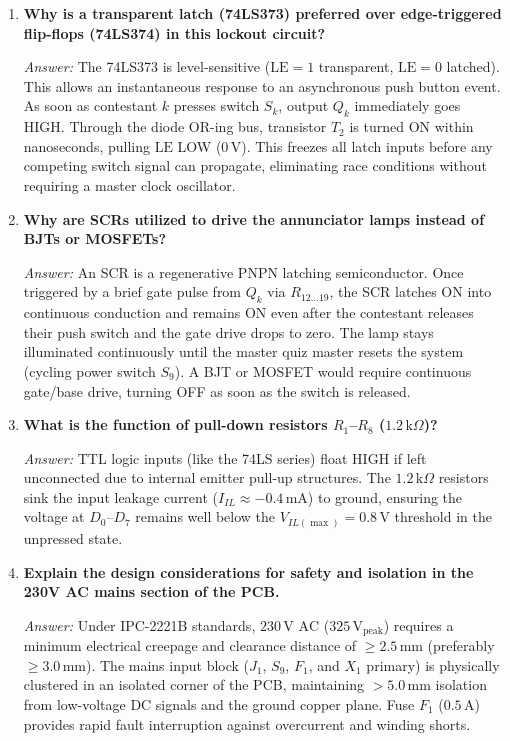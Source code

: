 \documentclass[11pt,a4paper]{article}
\begin{document}
\begin{enumerate}
    \item \textbf{Why is a transparent latch (74LS373) preferred over edge-triggered flip-flops (74LS374) in this lockout circuit?}
    
    \textit{Answer:} The 74LS373 is level-sensitive ($\text{LE} = 1$ transparent, $\text{LE} = 0$ latched). This allows an instantaneous response to an asynchronous push button event. As soon as contestant $k$ presses switch $S_k$, output $Q_k$ immediately goes HIGH. Through the diode OR-ing bus, transistor $T_2$ is turned ON within nanoseconds, pulling $\text{LE}$ LOW ($0\,\text{V}$). This freezes all latch inputs before any competing switch signal can propagate, eliminating race conditions without requiring a master clock oscillator.

    \item \textbf{Why are SCRs utilized to drive the annunciator lamps instead of BJTs or MOSFETs?}
    
    \textit{Answer:} An SCR is a regenerative PNPN latching semiconductor. Once triggered by a brief gate pulse from $Q_k$ via $R_{12\dots 19}$, the SCR latches ON into continuous conduction and remains ON even after the contestant releases their push switch and the gate drive drops to zero. The lamp stays illuminated continuously until the master quiz master resets the system (cycling power switch $S_9$). A BJT or MOSFET would require continuous gate/base drive, turning OFF as soon as the switch is released.

    \item \textbf{What is the function of pull-down resistors $R_1$--$R_8$ ($1.2\,\text{k}\Omega$)?}
    
    \textit{Answer:} TTL logic inputs (like the 74LS series) float HIGH if left unconnected due to internal emitter pull-up structures. The $1.2\,\text{k}\Omega$ resistors sink the input leakage current ($I_{IL} \approx -0.4\,\text{mA}$) to ground, ensuring the voltage at $D_0$--$D_7$ remains well below the $V_{IL(\max)} = 0.8\,\text{V}$ threshold in the unpressed state.

    \item \textbf{Explain the design considerations for safety and isolation in the 230V AC mains section of the PCB.}
    
    \textit{Answer:} Under IPC-2221B standards, $230\,\text{V AC}$ ($325\,\text{V}_{\text{peak}}$) requires a minimum electrical creepage and clearance distance of $\ge 2.5\,\text{mm}$ (preferably $\ge 3.0\,\text{mm}$). The mains input block ($J_1$, $S_9$, $F_1$, and $X_1$ primary) is physically clustered in an isolated corner of the PCB, maintaining $>5.0\,\text{mm}$ isolation from low-voltage DC signals and the ground copper plane. Fuse $F_1$ ($0.5\,\text{A}$) provides rapid fault interruption against overcurrent and winding shorts.


\end{enumerate}
\end{document}
